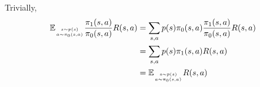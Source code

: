 \begin{answer}
    Trivially,
    \[
        \begin{aligned}
\mathbb E_{s\sim p(s)\atop a\sim\pi_0(s, a)} \frac{\pi_1(s, a)}{\pi_0(s, a)} R(s, a) &= \sum_{s, a}p(s)\pi_0(s, a)\frac{\pi_1(s, a)}{\pi_0(s, a)} R(s, a)\\
&=\sum_{s, a}p(s)\pi_1(s, a)R(s, a)\\
            &= \mathbb E_{s\sim p(s)\atop a\sim\pi_0(s, a)}R(s, a)
\end{aligned}
    \]

\end{answer}

